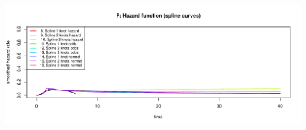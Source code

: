 \documentclass[]{article}
\begin{document}
\begin{flushleft}\includegraphics[height=0.29\textheight]{Images/validate_extrapolation1-6} \end{flushleft}

\begin{table}


\end{table}
\end{document}
